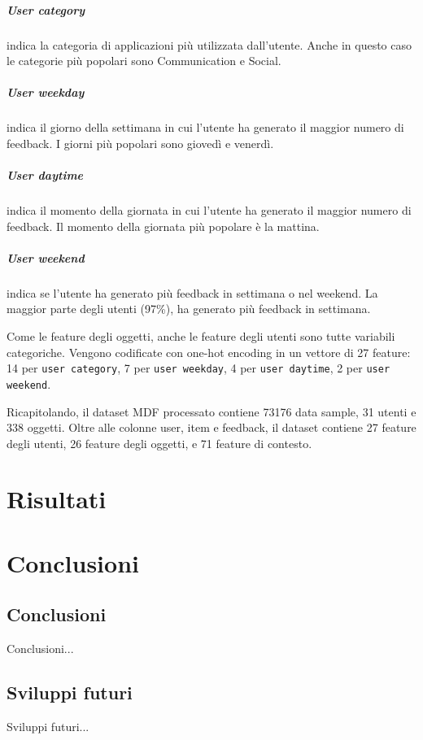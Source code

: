 \documentclass[12pt,italian]{report}
\begin{document}
\paragraph{User category} indica la categoria di applicazioni più utilizzata dall'utente. Anche in questo caso le categorie più popolari sono Communication e Social.

\paragraph{User weekday} indica il giorno della settimana in cui l'utente ha generato il maggior numero di feedback. I giorni più popolari sono giovedì e venerdì.

\paragraph{User daytime} indica il momento della giornata in cui l'utente ha generato il maggior numero di feedback. Il momento della giornata più popolare è la mattina.

\paragraph{User weekend} indica se l'utente ha generato più feedback in settimana o nel weekend. La maggior parte degli utenti (97\%), ha generato più feedback in settimana.

\bigskip \noindent
Come le feature degli oggetti, anche le feature degli utenti sono tutte variabili categoriche. Vengono codificate con one-hot encoding in un vettore di 27 feature: 14 per \texttt{user category}, 7 per \texttt{user weekday}, 4 per \texttt{user daytime}, 2 per \texttt{user weekend}.

Ricapitolando, il dataset MDF processato contiene 73176 data sample, 31 utenti e 338 oggetti. Oltre alle colonne user, item e feedback, il dataset contiene  27 feature degli utenti, 26 feature degli oggetti, e 71 feature di contesto.


% 
% 

\chapter{Risultati} \label{chap:risultati}


% 
% 

\chapter{Conclusioni} \label{chap:conclusioni}

\section{Conclusioni}

Conclusioni...

\section{Sviluppi futuri}

Sviluppi futuri...



%
%



\end{document}
